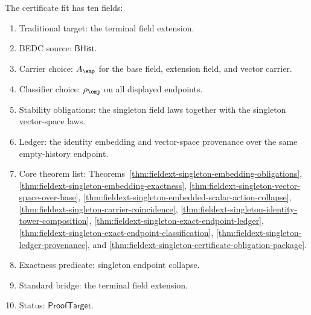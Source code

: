 \begin{definition}
The certificate fit has ten fields:
\begin{enumerate}
  \item Traditional target: the terminal field extension.
  \item BEDC source: $\mathsf{BHist}$.
  \item Carrier choice: $A_{\emp}$ for the base field, extension field, and
  vector carrier.
  \item Classifier choice: $\rho_{\emp}$ on all displayed endpoints.
  \item Stability obligations: the singleton field laws together with the
  singleton vector-space laws.
  \item Ledger: the identity embedding and vector-space provenance over the
  same empty-history endpoint.
  \item Core theorem list:
  Theorems~\ref{thm:fieldext-singleton-embedding-obligations},
  \ref{thm:fieldext-singleton-embedding-exactness},
  \ref{thm:fieldext-singleton-vector-space-over-base},
  \ref{thm:fieldext-singleton-embedded-scalar-action-collapse},
  \ref{thm:fieldext-singleton-carrier-coincidence},
  \ref{thm:fieldext-singleton-identity-tower-composition},
  \ref{thm:fieldext-singleton-exact-endpoint-ledger},
  \ref{thm:fieldext-singleton-exact-endpoint-classification},
  \ref{thm:fieldext-singleton-ledger-provenance}, and
  \ref{thm:fieldext-singleton-certificate-obligation-package}.
  \item Exactness predicate: singleton endpoint collapse.
  \item Standard bridge: the terminal field extension.
  \item Status: $\mathsf{ProofTarget}$.
\end{enumerate}
\end{definition}

